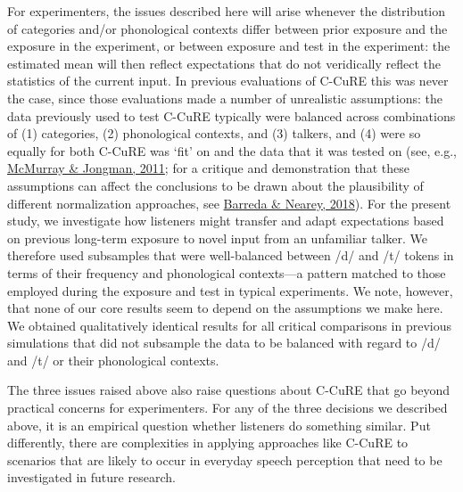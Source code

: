 \documentclass[
  11pt,
  english,
  man,floatsintext]{apa6}
\begin{document}
For experimenters, the issues described here will arise whenever the distribution of categories and/or phonological contexts differ between prior exposure and the exposure in the experiment, or between exposure and test in the experiment: the estimated mean will then reflect expectations that do not veridically reflect the statistics of the current input. In previous evaluations of C-CuRE this was never the case, since those evaluations made a number of unrealistic assumptions: the data previously used to test C-CuRE typically were balanced across combinations of (1) categories, (2) phonological contexts, and (3) talkers, and (4) were so equally for both C-CuRE was `fit' on and the data that it was tested on (see, e.g., \protect\hyperlink{ref-mcmurray-jongman2011}{McMurray \& Jongman, 2011}; for a critique and demonstration that these assumptions can affect the conclusions to be drawn about the plausibility of different normalization approaches, see \protect\hyperlink{ref-barreda-nearey2018}{Barreda \& Nearey, 2018}). For the present study, we investigate how listeners might transfer and adapt expectations based on previous long-term exposure to novel input from an unfamiliar talker. We therefore used subsamples that were well-balanced between /d/ and /t/ tokens in terms of their frequency and phonological contexts---a pattern matched to those employed during the exposure and test in typical experiments. We note, however, that none of our core results seem to depend on the assumptions we make here. We obtained qualitatively identical results for all critical comparisons in previous simulations that did not subsample the data to be balanced with regard to /d/ and /t/ or their phonological contexts.

The three issues raised above also raise questions about C-CuRE that go beyond practical concerns for experimenters. For any of the three decisions we described above, it is an empirical question whether listeners do something similar. Put differently, there are complexities in applying approaches like C-CuRE to scenarios that are likely to occur in everyday speech perception that need to be investigated in future research.
\end{document}

